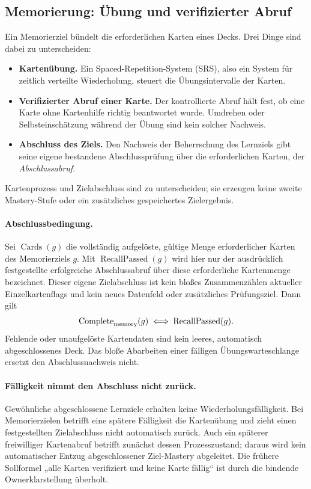 \subsection{Memorierung: Übung und verifizierter Abruf}
\label{sec:memory}

Ein Memorierziel bündelt die erforderlichen Karten eines Decks. Drei Dinge
sind dabei zu unterscheiden:
\begin{itemize}
\item \textbf{Kartenübung.} Ein Spaced-Repetition-System (SRS), also ein
 System für zeitlich verteilte Wiederholung, steuert die
 Übungsintervalle der Karten.
\item \textbf{Verifizierter Abruf einer Karte.} Der kontrollierte Abruf
 hält fest, ob eine Karte ohne Kartenhilfe richtig beantwortet wurde.
 Umdrehen oder Selbsteinschätzung während der Übung sind kein solcher
 Nachweis.
\item \textbf{Abschluss des Ziels.} Den Nachweis der Beherrschung des
 Lernziels gibt seine eigene bestandene Abschlussprüfung über die
 erforderlichen Karten, der \emph{Abschlussabruf}.
\end{itemize}
Kartenprozess und Zielabschluss sind zu unterscheiden; sie erzeugen
keine zweite Mastery-Stufe oder ein zusätzliches gespeichertes Zielergebnis.

\paragraph{Abschlussbedingung.}
Sei $\operatorname{Cards}(g)$ die vollständig aufgelöste, gültige Menge
erforderlicher Karten des Memorierziels $g$.
Mit $\operatorname{RecallPassed}(g)$ wird hier nur der ausdrücklich
festgestellte erfolgreiche Abschlussabruf über diese erforderliche
Kartenmenge bezeichnet. Dieser eigene Zielabschluss ist kein bloßes
Zusammenzählen aktueller Einzelkartenflags und kein neues
Datenfeld oder zusätzliches Prüfungsziel. Dann gilt
\[
  \operatorname{Complete}_{\mathrm{memory}}(g)
  \iff \operatorname{RecallPassed}(g).
\]
Fehlende oder unaufgelöste Kartendaten sind kein leeres, automatisch
abgeschlossenes Deck. Das bloße Abarbeiten einer fälligen Übungswarteschlange
ersetzt den Abschlussnachweis nicht.

\paragraph{Fälligkeit nimmt den Abschluss nicht zurück.}
Gewöhnliche abgeschlossene Lernziele erhalten keine Wiederholungsfälligkeit.
Bei Memorierzielen betrifft eine spätere Fälligkeit die Kartenübung und zieht
einen festgestellten Zielabschluss nicht automatisch zurück. Auch ein
späterer freiwilliger Kartenabruf betrifft zunächst dessen Prozesszustand;
daraus wird kein automatischer Entzug abgeschlossener Ziel-Mastery abgeleitet.
Die frühere Sollformel „alle Karten verifiziert und keine Karte fällig“
ist durch die bindende Ownerklarstellung überholt.

